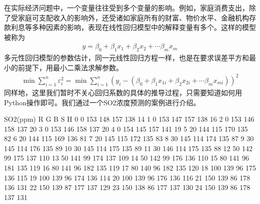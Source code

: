 \documentclass[letterpaper,10pt,english]{sphinxmanual}
\begin{document}
在实际经济问题中，一个变量往往受到多个变量的影响。例如，家庭消费支出，除了受家庭可支配收入的影响外，还受诸如家庭所有的财富、物价水平、金融机构存款利息等多种因素的影响，表现在线性回归模型中的解释变量有多个。这样的模型被称为
\begin{equation*}
\begin{split}
y=\beta_{0}+\beta_{1} x_{1}+\beta_{2} x_{2}+\cdots \beta_{m} x_{m}
\end{split}
\end{equation*}
多元性回归模型的参数估计，同一元线性回归方程一样，也是在要求误差平方和最小的前提下，用最小二乘法求解参数。
\begin{equation*}
\begin{split}
\min \sum_{i=1}^{n} \varepsilon_{i}^{2}=\min \sum_{i=1}^{n}\left(y_{i}-\left(\beta_{0}+\beta_{1} x_{1i}+\beta_{2} x_{2i}+\cdots \beta_{m} x_{mi}\right)\right)^{2}
\end{split}
\end{equation*}
同样地，这里我们暂时不关心回归系数的具体的推导过程，只需要知道如何用Python操作即可。我们通过一个SO2浓度预测的案例进行介绍。

\begin{sphinxVerbatim}[commandchars=\\\{\}]
    
   
 
\end{sphinxVerbatim}

\begin{sphinxVerbatim}[commandchars=\\\{\}]
    SO2(ppm)    R    G    B    S    H
0          0  153  148  157  138   14
1          0  153  147  157  138   16
2          0  153  146  158  137   20
3          0  153  146  158  137   20
4          0  154  145  157  141   19
5         20  144  115  170  135   82
6         20  144  115  169  136   81
7         20  145  115  172  135   83
8         30  145  114  174  135   87
9         30  145  114  176  135   89
10        30  145  114  175  135   89
11        30  146  114  175  135   88
12        50  142   99  175  137  110
13        50  141   99  174  137  109
14        50  142   99  176  136  110
15        80  141   96  181  135  119
16        80  141   96  182  135  119
17        80  140   96  182  135  120
18       100  139   96  175  136  115
19       100  139   96  174  136  114
20       100  139   96  176  136  116
21       150  139   86  178  136  131
22       150  139   87  177  137  129
23       150  138   86  177  137  130
24       150  139   86  178  137  131
\end{sphinxVerbatim}
\end{document}
